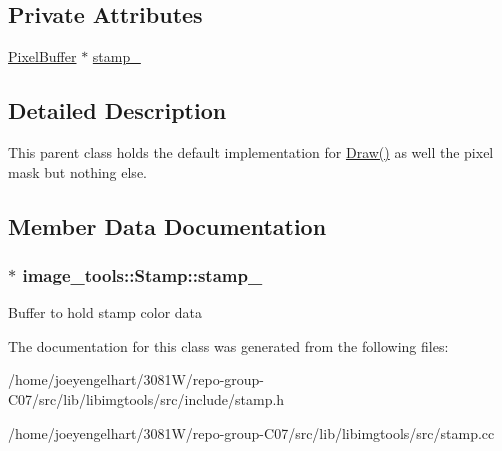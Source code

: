 \subsection*{Private Attributes}
\begin{DoxyCompactItemize}
\item 
\hyperlink{classimage__tools_1_1PixelBuffer}{Pixel\+Buffer} $\ast$ \hyperlink{classimage__tools_1_1Stamp_a1fb4be15efa71eb06883fab6765126f7}{stamp\+\_\+}
\end{DoxyCompactItemize}


\subsection{Detailed Description}
This parent class holds the default implementation for \hyperlink{classimage__tools_1_1Stamp_aad46ea95e5a9c4a5ef90ee262262070f}{Draw()} as well the pixel mask but nothing else. 

\subsection{Member Data Documentation}
\subsubsection[{\texorpdfstring{stamp\+\_\+}{stamp_}}]{$\ast$ image\+\_\+tools\+::\+Stamp\+::stamp\+\_\+\hspace{0.3cm}{\ttfamily [private]}}\hypertarget{classimage__tools_1_1Stamp_a1fb4be15efa71eb06883fab6765126f7}{}\label{classimage__tools_1_1Stamp_a1fb4be15efa71eb06883fab6765126f7}
Buffer to hold stamp color data 

The documentation for this class was generated from the following files\+:\begin{DoxyCompactItemize}
\item 
/home/joeyengelhart/3081\+W/repo-\/group-\/\+C07/src/lib/libimgtools/src/include/stamp.\+h\item 
/home/joeyengelhart/3081\+W/repo-\/group-\/\+C07/src/lib/libimgtools/src/stamp.\+cc\end{DoxyCompactItemize}
